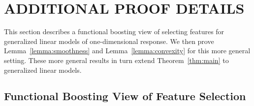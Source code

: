 
\section{ADDITIONAL PROOF DETAILS}
\label{sec:gomp_proof_II}
This section describes a functional boosting view of selecting features for generalized linear models of one-dimensional response. We then prove Lemma~\ref{lemma:smoothness} and Lemma~\ref{lemma:convexity} for this more general setting. These more general
results in turn extend Theorem~\ref{thm:main} to generalized 
linear models.

\subsection{Functional Boosting View of Feature Selection}
\label{sec:functional}

